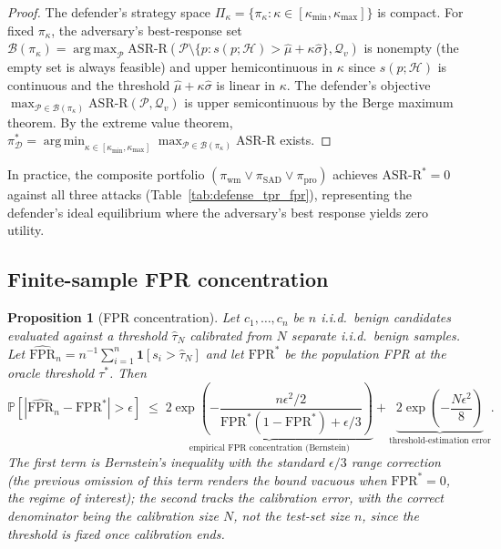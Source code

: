 \documentclass{article}
\newtheorem{proposition}[theorem]{Proposition}
\theoremstyle{definition}
\newcommand{\asrr}{\text{ASR-R}}
\newcommand{\fpr}{\text{FPR}}
\newcommand{\PP}{\mathbb{P}}
\newcommand{\cH}{\mathcal{H}}
\newcommand{\cP}{\mathcal{P}}
\newcommand{\cQ}{\mathcal{Q}}
\newcommand{\cD}{\mathcal{D}}
\newcommand{\cB}{\mathcal{B}}
\DeclareMathOperator*{\argmax}{arg\,max}
\DeclareMathOperator*{\argmin}{arg\,min}
\begin{document}
\begin{proof}
The defender's strategy space $\Pi_\kappa = \{\pi_\kappa : \kappa \in [\kappa_{\min}, \kappa_{\max}]\}$ is compact. For fixed $\pi_\kappa$, the adversary's best-response set $\cB(\pi_\kappa) = \argmax_{\cP} \asrr(\cP \setminus \{p : s(p; \cH) > \hat{\mu} + \kappa\hat{\sigma}\}, \cQ_v)$ is nonempty (the empty set is always feasible) and upper hemicontinuous in $\kappa$ since $s(p; \cH)$ is continuous and the threshold $\hat{\mu} + \kappa\hat{\sigma}$ is linear in $\kappa$. The defender's objective $\max_{\cP \in \cB(\pi_\kappa)} \asrr(\cP, \cQ_v)$ is upper semicontinuous by the Berge maximum theorem. By the extreme value theorem, $\pi_{\cD}^* = \argmin_{\kappa \in [\kappa_{\min}, \kappa_{\max}]} \max_{\cP \in \cB(\pi_\kappa)} \asrr$ exists.
\end{proof}

In practice, the composite portfolio $(\pi_{\text{wm}} \lor \pi_{\text{SAD}} \lor \pi_{\text{pro}})$ achieves $\asrr^* = 0$ against all three attacks (Table~\ref{tab:defense_tpr_fpr}), representing the defender's ideal equilibrium where the adversary's best response yields zero utility.

\subsection{Finite-sample FPR concentration}
\label{app:fpr_concentration}

\begin{proposition}[FPR concentration]
\label{prop:fpr_concentration}
Let $c_1, \ldots, c_n$ be $n$ i.i.d.\ benign candidates evaluated against a threshold $\hat\tau_N$ calibrated from $N$ separate i.i.d.\ benign samples. Let $\widehat{\fpr}_n = n^{-1}\sum_{i=1}^n \mathbf{1}[s_i > \hat\tau_N]$ and let $\fpr^*$ be the population FPR at the oracle threshold $\tau^*$. Then
\begin{equation}
  \PP\!\left[|\widehat{\fpr}_n - \fpr^*| > \epsilon\right]
  \;\leq\;
  \underbrace{2\exp\!\left(-\frac{n\epsilon^2/2}{\fpr^*(1-\fpr^*) + \epsilon/3}\right)}_{\text{empirical FPR concentration (Bernstein)}}
  +
  \underbrace{2\exp\!\left(-\frac{N\epsilon^2}{8}\right)}_{\text{threshold-estimation error}}.
\end{equation}
The first term is Bernstein's inequality with the standard $\epsilon/3$ range correction (the previous omission of this term renders the bound vacuous when $\fpr^* = 0$, the regime of interest); the second tracks the calibration error, with the correct denominator being the calibration size $N$, \emph{not} the test-set size $n$, since the threshold is fixed once calibration ends.
\end{proposition}
\end{document}
